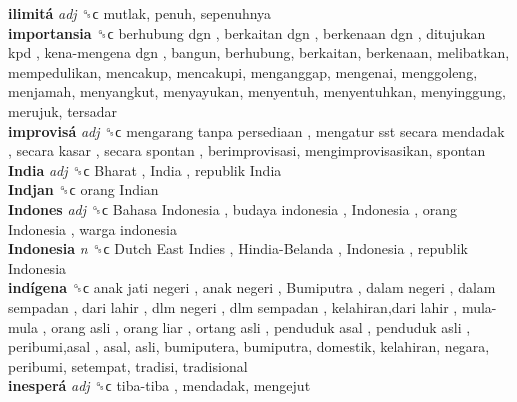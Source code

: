 \textbf{ilimitá} \emph{adj}  ␝ϲ  mutlak, penuh, sepenuhnya  \\
\textbf{importansia} ␝ϲ   berhubung dgn ,  berkaitan dgn ,  berkenaan dgn ,  ditujukan kpd ,  kena-mengena dgn , bangun, berhubung, berkaitan, berkenaan, melibatkan, mempedulikan, mencakup, mencakupi, menganggap, mengenai, menggoleng, menjamah, menyangkut, menyayukan, menyentuh, menyentuhkan, menyinggung, merujuk, tersadar  \\
\textbf{improvisá} \emph{adj}  ␝ϲ   mengarang tanpa persediaan ,  mengatur sst secara mendadak ,  secara kasar ,  secara spontan , berimprovisasi, mengimprovisasikan, spontan  \\
\textbf{India} \emph{adj}  ␝ϲ   Bharat ,  India ,  republik India   \\
\textbf{Indjan} ␝ϲ   orang Indian   \\
\textbf{Indones} \emph{adj}  ␝ϲ   Bahasa Indonesia ,  budaya indonesia ,  Indonesia ,  orang Indonesia ,  warga indonesia   \\
\textbf{Indonesia} \emph{n}  ␝ϲ   Dutch East Indies ,  Hindia-Belanda ,  Indonesia ,  republik Indonesia   \\
\textbf{indígena} ␝ϲ   anak jati negeri ,  anak negeri ,  Bumiputra ,  dalam negeri ,  dalam sempadan ,  dari lahir ,  dlm negeri ,  dlm sempadan ,  kelahiran,dari lahir ,  mula-mula ,  orang asli ,  orang liar ,  ortang asli ,  penduduk asal ,  penduduk asli ,  peribumi,asal , asal, asli, bumiputera, bumiputra, domestik, kelahiran, negara, peribumi, setempat, tradisi, tradisional  \\
\textbf{inesperá} \emph{adj}  ␝ϲ   tiba-tiba , mendadak, mengejut  \\
